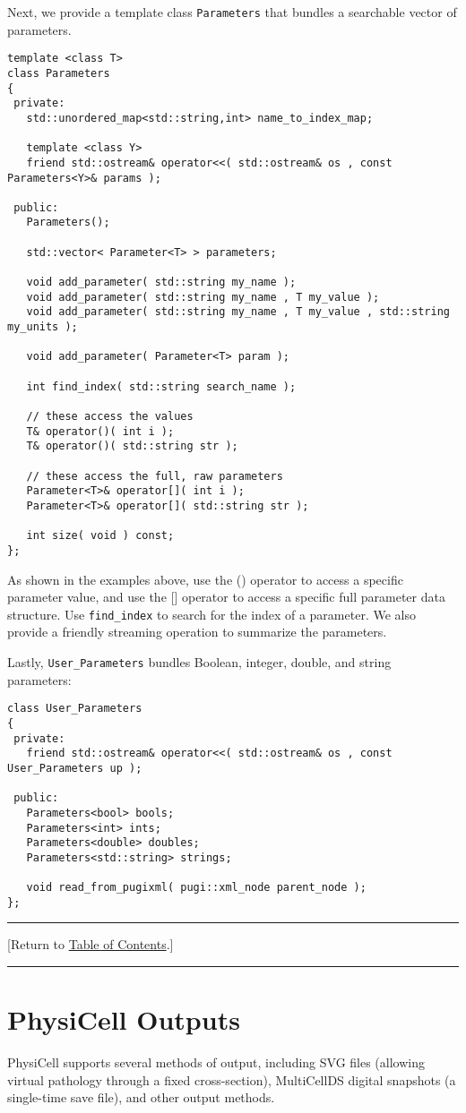 \documentclass[12pt]{article}
\renewcommand{\v}{\verb}
\newcommand{\blue}[1]{\textcolor{blue}{#1}}
\newcommand{\DONE}{}%
\newcommand{\TOClink}{\begin{center}\hrule\vskip-5pt\phantom{.}\hfill[Return to \hyperlink{TOC}{Table of Contents}.]\hfill\phantom{.}\vskip3pt\hrule\end{center}}
\begin{document}
Next, we provide a template class \v|Parameters| that bundles a searchable vector of parameters. 
\begin{verbatim}
template <class T>
class Parameters
{
 private:
   std::unordered_map<std::string,int> name_to_index_map; 
   
   template <class Y>
   friend std::ostream& operator<<( std::ostream& os , const Parameters<Y>& params ); 

 public: 
   Parameters(); 
 
   std::vector< Parameter<T> > parameters; 
   
   void add_parameter( std::string my_name ); 
   void add_parameter( std::string my_name , T my_value ); 
   void add_parameter( std::string my_name , T my_value , std::string my_units ); 
   
   void add_parameter( Parameter<T> param );
   
   int find_index( std::string search_name ); 
   
   // these access the values 
   T& operator()( int i );
   T& operator()( std::string str ); 

   // these access the full, raw parameters 
   Parameter<T>& operator[]( int i );
   Parameter<T>& operator[]( std::string str ); 
   
   int size( void ) const; 
};
\end{verbatim} 
As shown in the examples above, use the () operator to access a specific parameter value, and use the [] operator to access a specific full parameter data structure. Use \v|find_index| to search for the index of a parameter. We also provide a friendly streaming operation to summarize the parameters. 

Lastly, \v|User_Parameters| bundles Boolean, integer, double, and string parameters: 
\begin{verbatim}
class User_Parameters
{
 private:
   friend std::ostream& operator<<( std::ostream& os , const User_Parameters up ); 
 
 public:
   Parameters<bool> bools; 
   Parameters<int> ints; 
   Parameters<double> doubles; 
   Parameters<std::string> strings; 
   
   void read_from_pugixml( pugi::xml_node parent_node );
}; 
\end{verbatim}

\TOClink 

\section{PhysiCell Outputs \DONE}
\label{sec:Outputs}
PhysiCell supports several methods of output, including 
SVG files (allowing virtual pathology through a fixed cross-section), 
MultiCellDS digital snapshots (a single-time save file), 
and other output methods. 
\end{document}
